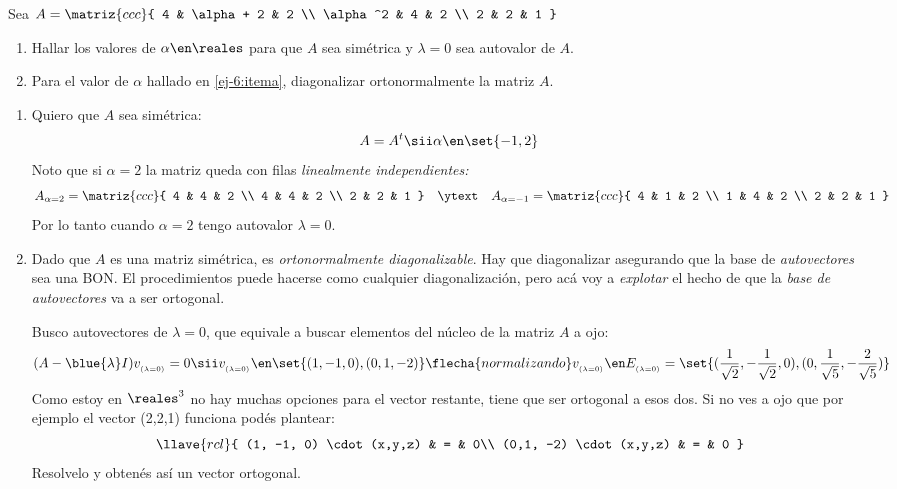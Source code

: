 \begin{enunciado}{\ejercicio}
  Sea $A =
    \matriz{ccc}{
      4 & \alpha + 2 & 2 \\
      \alpha^2 & 4 & 2 \\
      2 & 2 & 1
    }$
  \begin{enumerate}[label=(\alph*)]
    \item\label{ej-6:itema} Hallar los valores de $\alpha \en \reales$ para que $A$ sea simétrica y $\lambda = 0$ sea
          autovalor de $A$.

    \item Para el valor de $\alpha$ hallado en \ref{ej-6:itema}, diagonalizar ortonormalmente la matriz $A$.
  \end{enumerate}
\end{enunciado}

\begin{enumerate}[label=(\alph*)]
  \item Quiero que $A$ sea simétrica:
        $$
          A = A^t
          \sii
          \alpha \en \set{-1, 2}
        $$
        Noto que si $\alpha = 2$ la matriz queda con filas \textit{linealmente independientes:}
        $$
          A_{\alpha = 2} =
          \matriz{ccc}{
            4 & 4 & 2 \\
            4 & 4 & 2 \\
            2 & 2 & 1
          }
          \quad
          \ytext
          \quad
          A_{\alpha = -1} =
          \matriz{ccc}{
            4 & 1 & 2 \\
            1 & 4 & 2 \\
            2 & 2 & 1
          }
        $$
        Por lo tanto cuando $\alpha = 2$ tengo autovalor $\lambda = 0$.

  \item Dado que $A$ es una matriz simétrica, es \textit{ortonormalmente diagonalizable}. Hay que diagonalizar
        asegurando que la base de \textit{autovectores} sea una BON. El procedimientos puede hacerse como cualquier
        diagonalización, pero acá voy a \textit{explotar } el hecho de que la \textit{base de autovectores}
        va a ser ortogonal.

        Busco autovectores de $\lambda = 0$, que equivale a buscar elementos del núcleo de la matriz $A$ a ojo:
        $$
          (A - \blue{\lambda}I)v_{_{(\lambda = 0)}} = 0
          \sii
          v_{_{(\lambda = 0)}} \en \set{(1, -1, 0), (0,1, -2)}
          \flecha{normalizando}
          v_{_{(\lambda = 0)}} \en E_{_{(\lambda = 0)}} =
          \set{(\frac{1}{\sqrt{2}}, -\frac{1}{\sqrt{2}}, 0), (0,\frac{1}{\sqrt{5}}, -\frac{2}{\sqrt{5}})}
        $$
        Como estoy en $\reales^3$ no hay muchas opciones para el vector restante, tiene que ser ortogonal a esos dos. Si no ves a ojo
        que por ejemplo el vector (2,2,1) funciona podés plantear:
        $$
          \llave{rcl}{
            (1, -1, 0) \cdot (x,y,z)    & = & 0\\
            (0,1, -2) \cdot (x,y,z)    & = & 0
          }
        $$
        Resolvelo y obtenés así un vector ortogonal.


\end{enumerate}
